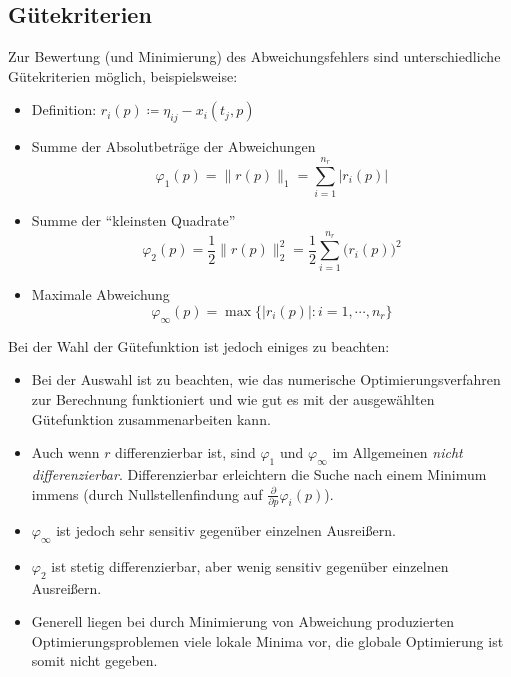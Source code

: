 \documentclass[a4paper, 11pt, accentcolor = tud3b]{tudreport}
\providecommand{\abs}[1]{\ensuremath{{\lvert #1 \rvert}}}
\begin{document}
            \subsection{Gütekriterien} %
                Zur Bewertung (und Minimierung) des Abweichungsfehlers sind unterschiedliche Gütekriterien möglich, beispielsweise:
                \begin{itemize}
	                \item Definition: \( r_i(p) \coloneqq \eta _ {ij} - x _ i (t _ j, p) \)
                	\item Summe der Absolutbeträge der Abweichungen
	                	\begin{equation*}
		                	\varphi _ 1 (p) = \lVert r(p) \rVert _ 1 = \sum_{i = 1}^{n _ r} \abs{r_i(p)}
	                	\end{equation*}
	                \item Summe der \enquote{kleinsten Quadrate}
		                \begin{equation*}
			                \varphi _ 2 (p) = \frac{1}{2} \lVert r(p) \rVert _ 2 ^ 2 = \frac{1}{2} \sum_{i = 1}^{n _ r} \big( r _ i (p) \big) ^ 2
		                \end{equation*}
		            \item Maximale Abweichung
			            \begin{equation*}
				            \varphi _ \infty (p) = \max \{ \abs{r _ i (p)} : i = 1, \cdots, n _ r \}
			            \end{equation*}
                \end{itemize}
                
                Bei der Wahl der Gütefunktion ist jedoch einiges zu beachten:
                \begin{itemize}
                	\item Bei der Auswahl ist zu beachten, wie das numerische Optimierungsverfahren zur Berechnung funktioniert und wie gut es mit der ausgewählten Gütefunktion zusammenarbeiten kann.
                	\item Auch wenn \(r\) differenzierbar ist, sind \( \varphi_1 \) und \( \varphi_\infty \) im Allgemeinen \textit{nicht differenzierbar}. Differenzierbar erleichtern die Suche nach einem Minimum immens (durch Nullstellenfindung auf \( \frac{\partial}{\partial p} \varphi _ i (p) \)).
                	\item \( \varphi _ \infty \) ist jedoch sehr sensitiv gegenüber einzelnen Ausreißern.
                	\item \( \varphi _ 2 \) ist stetig differenzierbar, aber wenig sensitiv gegenüber einzelnen Ausreißern.
                	\item Generell liegen bei durch Minimierung von Abweichung produzierten Optimierungsproblemen viele lokale Minima vor, die globale Optimierung ist somit nicht gegeben.
                \end{itemize}
\end{document}
